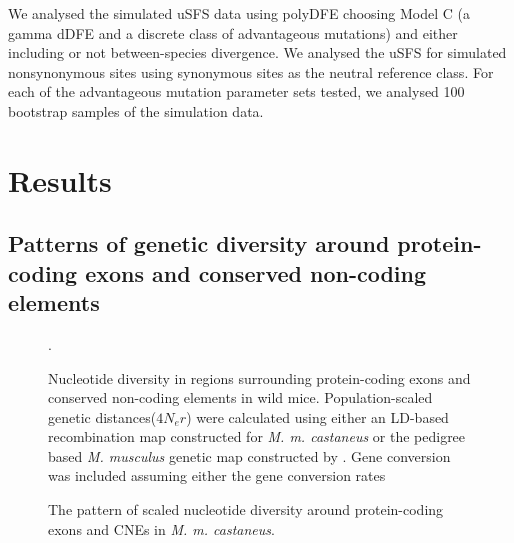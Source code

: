 \documentclass[11pt]{article}
\begin{document}
	 We analysed the simulated uSFS data using polyDFE choosing Model C (a gamma dDFE and a discrete class of advantageous mutations) and either including or not between-species divergence. We analysed the uSFS for simulated nonsynonymous sites using synonymous sites as the neutral reference class. For each of the advantageous mutation parameter sets tested, we analysed 100 bootstrap samples of the simulation data.
 
 	
%
%


\section*{Results}

\subsection*{Patterns of genetic diversity around protein-coding exons and conserved non-coding elements}

\begin{figure}[h]
   \centering      
   \noindent{}
 \caption{Nucleotide diversity in regions surrounding protein-coding exons and conserved non-coding elements in wild mice. Population-scaled genetic distances($4N_er$) were calculated using either an LD-based recombination map constructed for \textit{M. m. castaneus} or the pedigree based \textit{M. musculus} genetic map constructed by \cite{RN232}. Gene conversion was included assuming either the gene conversion rates }.
 
 \label{fig:Diversity2x2}
\end{figure}

\linespread{1}
\begin{figure}[h]
   \centering      
   \noindent{}
 \caption{The pattern of scaled nucleotide diversity around protein-coding exons and CNEs in \textit{M. m. castaneus}.}  
 
 \label{fig:castaneusFit}
\end{figure}
\end{document}
